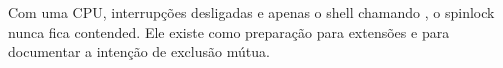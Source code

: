 \begin{nota}
Com uma CPU, interrup\c{c}\~oes desligadas e apenas o shell chamando
, o spinlock nunca fica contended. Ele existe como prepara\c{c}\~ao
para extens\~oes e para documentar a inten\c{c}\~ao de exclus\~ao m\'utua.
\end{nota}
